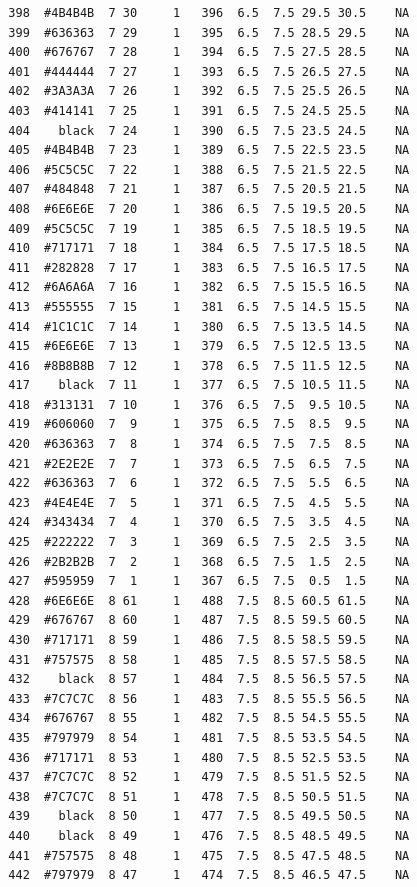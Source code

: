 \documentclass[12pt,twoside]{reedthesis}
\begin{document}
\begin{verbatim}
  398  #4B4B4B  7 30     1   396  6.5  7.5 29.5 30.5    NA
  399  #636363  7 29     1   395  6.5  7.5 28.5 29.5    NA
  400  #676767  7 28     1   394  6.5  7.5 27.5 28.5    NA
  401  #444444  7 27     1   393  6.5  7.5 26.5 27.5    NA
  402  #3A3A3A  7 26     1   392  6.5  7.5 25.5 26.5    NA
  403  #414141  7 25     1   391  6.5  7.5 24.5 25.5    NA
  404    black  7 24     1   390  6.5  7.5 23.5 24.5    NA
  405  #4B4B4B  7 23     1   389  6.5  7.5 22.5 23.5    NA
  406  #5C5C5C  7 22     1   388  6.5  7.5 21.5 22.5    NA
  407  #484848  7 21     1   387  6.5  7.5 20.5 21.5    NA
  408  #6E6E6E  7 20     1   386  6.5  7.5 19.5 20.5    NA
  409  #5C5C5C  7 19     1   385  6.5  7.5 18.5 19.5    NA
  410  #717171  7 18     1   384  6.5  7.5 17.5 18.5    NA
  411  #282828  7 17     1   383  6.5  7.5 16.5 17.5    NA
  412  #6A6A6A  7 16     1   382  6.5  7.5 15.5 16.5    NA
  413  #555555  7 15     1   381  6.5  7.5 14.5 15.5    NA
  414  #1C1C1C  7 14     1   380  6.5  7.5 13.5 14.5    NA
  415  #6E6E6E  7 13     1   379  6.5  7.5 12.5 13.5    NA
  416  #8B8B8B  7 12     1   378  6.5  7.5 11.5 12.5    NA
  417    black  7 11     1   377  6.5  7.5 10.5 11.5    NA
  418  #313131  7 10     1   376  6.5  7.5  9.5 10.5    NA
  419  #606060  7  9     1   375  6.5  7.5  8.5  9.5    NA
  420  #636363  7  8     1   374  6.5  7.5  7.5  8.5    NA
  421  #2E2E2E  7  7     1   373  6.5  7.5  6.5  7.5    NA
  422  #636363  7  6     1   372  6.5  7.5  5.5  6.5    NA
  423  #4E4E4E  7  5     1   371  6.5  7.5  4.5  5.5    NA
  424  #343434  7  4     1   370  6.5  7.5  3.5  4.5    NA
  425  #222222  7  3     1   369  6.5  7.5  2.5  3.5    NA
  426  #2B2B2B  7  2     1   368  6.5  7.5  1.5  2.5    NA
  427  #595959  7  1     1   367  6.5  7.5  0.5  1.5    NA
  428  #6E6E6E  8 61     1   488  7.5  8.5 60.5 61.5    NA
  429  #676767  8 60     1   487  7.5  8.5 59.5 60.5    NA
  430  #717171  8 59     1   486  7.5  8.5 58.5 59.5    NA
  431  #757575  8 58     1   485  7.5  8.5 57.5 58.5    NA
  432    black  8 57     1   484  7.5  8.5 56.5 57.5    NA
  433  #7C7C7C  8 56     1   483  7.5  8.5 55.5 56.5    NA
  434  #676767  8 55     1   482  7.5  8.5 54.5 55.5    NA
  435  #797979  8 54     1   481  7.5  8.5 53.5 54.5    NA
  436  #717171  8 53     1   480  7.5  8.5 52.5 53.5    NA
  437  #7C7C7C  8 52     1   479  7.5  8.5 51.5 52.5    NA
  438  #7C7C7C  8 51     1   478  7.5  8.5 50.5 51.5    NA
  439    black  8 50     1   477  7.5  8.5 49.5 50.5    NA
  440    black  8 49     1   476  7.5  8.5 48.5 49.5    NA
  441  #757575  8 48     1   475  7.5  8.5 47.5 48.5    NA
  442  #797979  8 47     1   474  7.5  8.5 46.5 47.5    NA

\end{verbatim}
\end{document}
